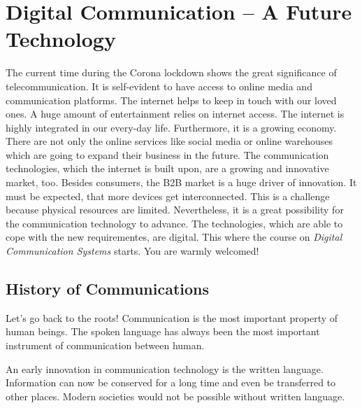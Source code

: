 {}
\chapter*{Digital Communication -- A Future Technology}

The current time during the Corona lockdown shows the great significance of telecommunication. It is self-evident to have access to online media and communication platforms. The internet helps to keep in touch with our loved ones. A huge amount of entertainment relies on internet access. The internet is highly integrated in our every-day life. Furthermore, it is a growing economy. There are not only the online services like social media or online warehouses which are going to expand their business in the future. The communication technologies, which the internet is built upon, are a growing and innovative market, too. Besides consumers, the \ac{B2B} market is a huge driver of innovation. It must be expected, that more devices get interconnected. This is a challenge because physical resources are limited. Nevertheless, it is a great possibility for the communication technology to advance. The technologies, which are able to cope with the new requirementes, are digital. This where the course on \emph{Digital Communication Systems} starts. You are warmly welcomed!

\section*{History of Communications}

Let's go back to the roots! Communication is the most important property of human beings. The spoken language has always been the most important instrument of communication between human.

An early innovation in communication technology is the written language. Information can now be conserved for a long time and even be transferred to other places. Modern societies would not be possible without written language.

